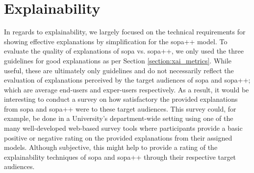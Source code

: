 \section{Explainability}

In regards to explainability, we largely focused on the technical requirements
for showing effective explanations by simplification for the \ac{sopa}++ model. To
evaluate the quality of explanations of \ac{sopa} vs. \ac{sopa}++, we only used the three
guidelines for good explanations as per Section \ref{section:xai_metrics}. While
useful, these are ultimately only guidelines and do not necessarily reflect the
evaluation of explanations perceived by the target audiences of \ac{sopa} and \ac{sopa}++;
which are average end-users and exper-users respectively. As a result, it would
be interesting to conduct a survey on how satisfactory the provided explanations
from \ac{sopa} and \ac{sopa}++ were to these target audiences. This survey could, for
example, be done in a University's department-wide setting using one of the many
well-developed web-based survey tools where participants provide a basic
positive or negative rating on the provided explanations from their assigned
models. Although subjective, this might help to provide a rating of the
explainability techniques of \ac{sopa} and \ac{sopa}++ through their respective target
audiences.

